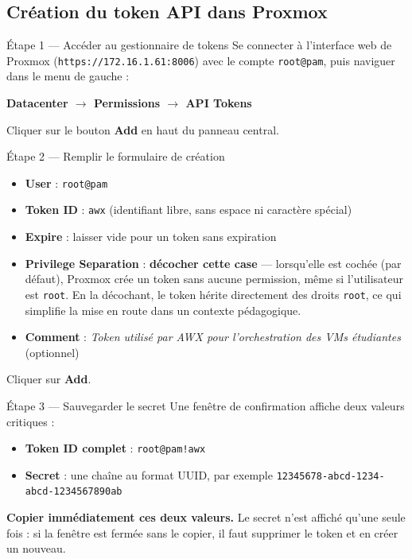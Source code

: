 \documentclass[a4paper]{article}
\newcommand{\cmd}[1]{\texttt{#1}}
\begin{document}
\subsection{Création du token API dans Proxmox}

\begin{stepbox}{Étape 1 --- Accéder au gestionnaire de tokens}
  Se connecter à l'interface web de Proxmox (\cmd{https://172.16.1.61:8006}) avec le compte \cmd{root@pam}, puis naviguer dans le menu de gauche :

  \medskip
  \textbf{Datacenter \(\to\) Permissions \(\to\) API Tokens}

  \medskip
  Cliquer sur le bouton \textbf{Add} en haut du panneau central.
\end{stepbox}

\begin{stepbox}{Étape 2 --- Remplir le formulaire de création}
  \begin{itemize}
    \item \textbf{User} : \cmd{root@pam}
    \item \textbf{Token ID} : \cmd{awx} (identifiant libre, sans espace ni caractère spécial)
    \item \textbf{Expire} : laisser vide pour un token sans expiration
    \item \textbf{Privilege Separation} : \textbf{décocher cette case} --- lorsqu'elle est cochée (par défaut), Proxmox crée un token sans aucune permission, même si l'utilisateur est \cmd{root}. En la décochant, le token hérite directement des droits \cmd{root}, ce qui simplifie la mise en route dans un contexte pédagogique.
    \item \textbf{Comment} : \textit{Token utilisé par AWX pour l'orchestration des VMs étudiantes} (optionnel)
  \end{itemize}

  Cliquer sur \textbf{Add}.
\end{stepbox}

\begin{stepbox}{Étape 3 --- Sauvegarder le secret}
  Une fenêtre de confirmation affiche deux valeurs critiques :
  \begin{itemize}
    \item \textbf{Token ID complet} : \cmd{root@pam!awx}
    \item \textbf{Secret} : une chaîne au format UUID, par exemple \cmd{12345678-abcd-1234-abcd-1234567890ab}
  \end{itemize}
  \textbf{Copier immédiatement ces deux valeurs.} Le secret n'est affiché qu'une seule fois : si la fenêtre est fermée sans le copier, il faut supprimer le token et en créer un nouveau.
\end{stepbox}
\end{document}
